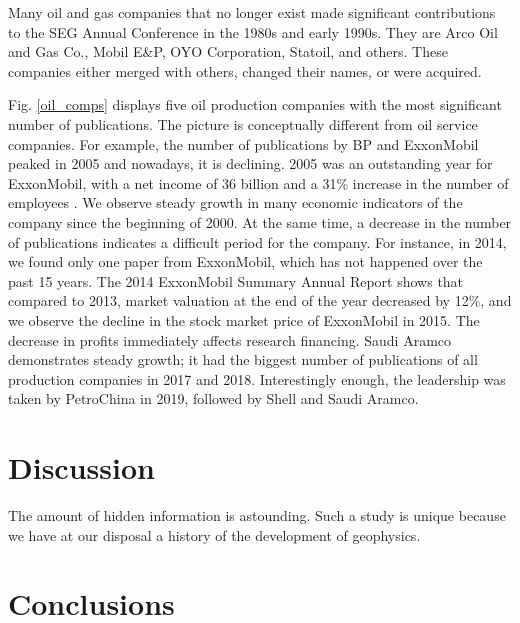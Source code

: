 \documentclass[geosciences,article,submit,moreauthors,pdftex]{Definitions/mdpi}
\begin{document}
Many oil and gas companies that no longer exist made significant contributions to the SEG Annual Conference in the 1980s and early 1990s. They are Arco Oil and Gas Co., Mobil E\&P, OYO Corporation, Statoil, and others. These companies either merged with others, changed their names, or were acquired.

Fig. \ref{oil_comps} displays five oil production companies with the most significant number of publications. The picture is conceptually different from oil service companies. For example, the number of publications by BP and ExxonMobil peaked in 2005 and nowadays, it is declining. 2005 was an outstanding year for ExxonMobil, with a net income of 36 billion and a 31\% increase in the number of employees \citep{ExxonMobil2005}. We observe steady growth in many economic indicators of the company since the beginning of 2000. At the same time, a decrease in the number of publications indicates a difficult period for the company. For instance, in 2014, we found only one paper from ExxonMobil, which has not happened over the past 15 years. The 2014 ExxonMobil Summary Annual Report \citep{ExxonMobil2014} shows that compared to 2013, market valuation at the end of the year decreased by 12\%, and we observe the decline in the stock market price of ExxonMobil in 2015. The decrease in profits immediately affects research financing. Saudi Aramco demonstrates steady growth; it had the biggest number of publications of all production companies in 2017 and 2018. Interestingly enough, the leadership was taken by PetroChina in 2019, followed by Shell and Saudi Aramco.


\section{Discussion}

The amount of hidden information is astounding. Such a study is unique because we have at our disposal a history of the development of geophysics. 


\section{Conclusions}
\end{document}
